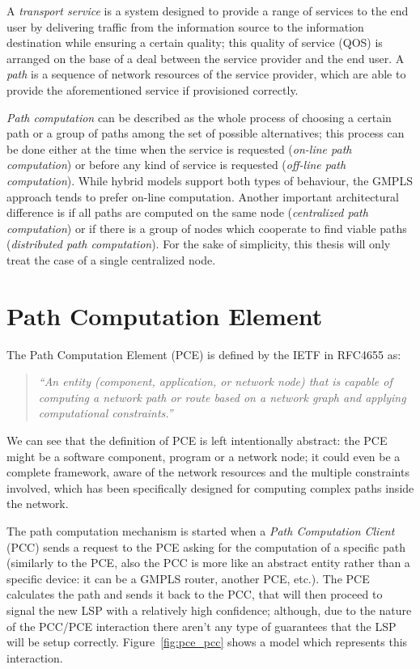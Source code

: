 \documentclass[10pt,a4paper]{report}
\begin{document}
A \textit{transport service} is a system designed to provide a range
of services to the end user by delivering traffic from the information
source to the information destination while ensuring a certain
quality; this quality of service (QOS) is arranged on the base of a
deal between the service provider and the end user. A \textit{path} is
a sequence of network resources of the service provider, which are
able to provide the aforementioned service if provisioned correctly.

\textit{Path computation} can be described as the whole process of
choosing a certain path or a group of paths among the set of possible
alternatives; this process can be done either at the time when the
service is requested (\textit{on-line path computation}) or before any
kind of service is requested (\textit{off-line path
  computation}). While hybrid models support both types of behaviour,
the GMPLS approach tends to prefer on-line computation. Another
important architectural difference is if all paths are computed on the
same node (\textit{centralized path computation}) or if there is a
group of nodes which cooperate to find viable paths
(\textit{distributed path computation}). For the sake of simplicity,
this thesis will only treat the case of a single centralized node.

\section{Path Computation Element}

The Path Computation Element (PCE) is defined by the IETF in RFC4655
as:
\begin{quote}
  \textit{``An entity (component, application, or network node) that
    is capable of computing a network path or route based on a network
    graph and applying computational constraints.''}
\end{quote}
We can see that the definition of PCE is left intentionally abstract:
the PCE might be a software component, program or a network node; it
could even be a complete framework, aware of the network resources and
the multiple constraints involved, which has been specifically
designed for computing complex paths inside the network.

The path computation mechanism is started when a \textit{Path
  Computation Client} (PCC) sends a request to the PCE asking for the
computation of a specific path (similarly to the PCE, also the PCC is
more like an abstract entity rather than a specific device: it can be
a GMPLS router, another PCE, etc.). The PCE calculates the path and
sends it back to the PCC, that will then proceed to signal the new LSP
with a relatively high confidence; although, due to the nature of the
PCC/PCE interaction there aren't any type of guarantees that the LSP
will be setup correctly. Figure~\ref{fig:pce_pcc} shows a model which
represents this interaction.
\end{document}
